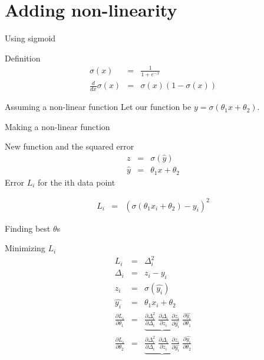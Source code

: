 \section{Adding non-linearity}
\begin{frame}{Using sigmoid}
	\begin{block}{Definition}
		\begin{align}
			\sigma(x)  &=& \frac{1}{1+e^{-x}}  \\
			\frac{d}{d x}\sigma(x) & = & \sigma(x) (1-\sigma(x))
		\end{align}
	\end{block}
	\begin{block}{Assuming a non-linear function}
		Let our function be $y=\sigma(\theta_1 x+\theta_2)$. 
	\end{block}
\end{frame}
\begin{frame}{Making a non-linear function}
	\begin{block}{New function and the squared error}  
	\begin{align}
	z&=&\sigma(\hat{y}) \\
	\hat{y} &=& \theta_1 x+\theta_2  
	\end{align}
	Error $L_i$ for the ith data point 
	
	\begin{align}
	L_i&=&(\sigma(\theta_1 x_i+\theta_2) - y_i)^2   
	\end{align}
	
\end{block}
\end{frame}
\begin{frame}{Finding best $\theta$s}
\begin{block}{Minimizing $L_i$}
	\begin{align}
		L_i &=&\Delta_i^2 \\
	\Delta_i &=& z_i-y_i \\
	z_i&=&\sigma(\hat{y_i}) \\
	\hat{y_i} &=& \theta_1 x_i+\theta_2  \\
	\frac{\partial L_i}{\partial \theta_1} &=&
	\underbrace{ 
	\frac{\partial \Delta_i^2}{\partial \Delta_i} \; 
	\frac{\partial \Delta_i}{\partial z_i}  \;
	\frac{\partial z_i}{\partial \hat{y_i}} }\;
	\frac{\partial \hat{y_i}}{\partial \theta_1} \\
	\frac{\partial L_i}{\partial \theta_2} &=&
	\underbrace{ 
	\frac{\partial \Delta_i^2}{\partial \Delta_i} \;  
	\frac{\partial \Delta_i}{\partial z_i}  \;
	\frac{\partial z_i}{\partial \hat{y_i}} } \;
	\frac{\partial \hat{y_i}}{\partial \theta_2} 
	\end{align}
\end{block}
\end{frame}
